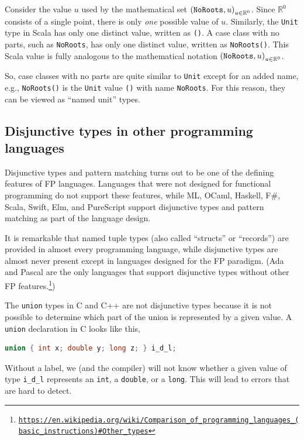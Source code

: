 Consider the value $u$ used by the mathematical set $\left(\text{\texttt{NoRoots}},u\right)_{u\in\mathbb{R}^{0}}$.
Since $\mathbb{R}^{0}$ consists of a single point, there is only
\emph{one} possible value of $u$. Similarly, the \lstinline!Unit!
type in Scala has only one distinct value, written as \lstinline!()!.
A case class with no parts, such as \lstinline!NoRoots!, has only
one distinct value, written as \lstinline!NoRoots()!. This Scala
value is fully analogous to the mathematical notation $\left(\text{\texttt{NoRoots}},u\right)_{u\in\mathbb{R}^{0}}$.

So, case classes with no parts are quite similar to \lstinline!Unit!
except for an added name, e.g., \lstinline!NoRoots()! is the \lstinline!Unit!
value \lstinline!()! with name \lstinline!NoRoots!. For this reason,
they can be viewed as \textsf{``}named unit\textsf{''} types.

\subsection{Disjunctive types in other programming languages}

Disjunctive types and pattern matching turns out to be one of the
defining features of FP languages. Languages that were not designed
for functional programming do not support these features, while ML,
OCaml, Haskell, F\#, Scala, Swift, Elm, and PureScript support disjunctive
types and pattern matching as part of the language design. 

It is remarkable that named tuple types (also called \textsf{``}structs\textsf{''}
or \textsf{``}records\textsf{''}) are provided in almost every programming language,
while disjunctive types are almost never present except in languages
designed for the FP paradigm. (Ada and Pascal are the only languages
that support disjunctive types without other FP features.\footnote{\texttt{\href{https://en.wikipedia.org/wiki/Comparison_of_programming_languages_(basic_instructions)\#Other_types}{https://en.wikipedia.org/wiki/Comparison\_of\_programming\_languages\_(basic\_instructions)\#Other\_types}}})

The \lstinline!union! types in C and C++ are not disjunctive types
because it is not possible to determine which part of the union is
represented by a given value. A \lstinline!union! declaration in
C looks like this,
\begin{lstlisting}[language=C]
union { int x; double y; long z; } i_d_l;
\end{lstlisting}
Without a label, we (and the compiler) will not know whether a given
value of type \lstinline!i_d_l! represents an \lstinline!int!, a
\lstinline!double!, or a \lstinline!long!. This will lead to errors
that are hard to detect.

